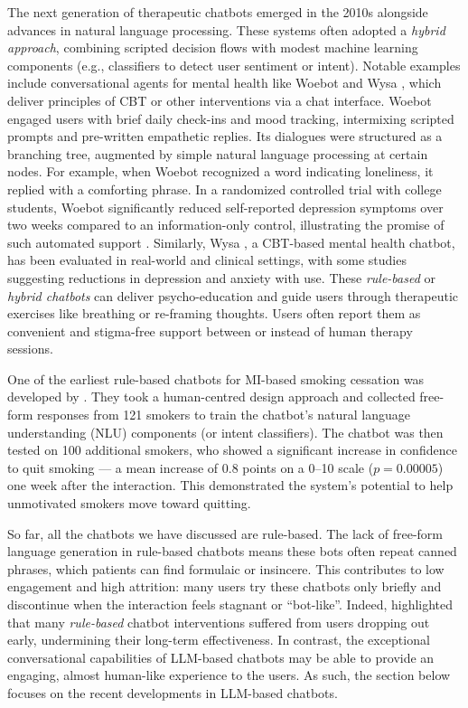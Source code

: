 The next generation of therapeutic chatbots emerged in the 2010s alongside advances in natural language processing. These systems often adopted a \emph{hybrid approach}, combining scripted decision flows with modest machine learning components (e.g., classifiers to detect user sentiment or intent). Notable examples include conversational agents for mental health like Woebot \cite{Fitzpatrick2017} and Wysa \cite{Chang2024}, which deliver principles of CBT or other interventions via a chat interface. Woebot engaged users with brief daily check-ins and mood tracking, intermixing scripted prompts and pre-written empathetic replies. Its dialogues were structured as a branching tree, augmented by simple natural language processing at certain nodes. For example, when Woebot recognized a word indicating loneliness, it replied with a comforting phrase. In a randomized controlled trial with college students, Woebot significantly reduced self-reported depression symptoms over two weeks compared to an information-only control, illustrating the promise of such automated support \cite{Fitzpatrick2017}. Similarly, Wysa \cite{Chang2024}, a CBT-based mental health chatbot, has been evaluated in real-world and clinical settings, with some studies suggesting reductions in depression and anxiety with use. These \emph{rule-based} or \emph{hybrid chatbots} can deliver psycho-education and guide users through therapeutic exercises like breathing or re-framing thoughts. Users often report them as convenient and stigma-free support between or instead of human therapy sessions.

One of the earliest rule-based chatbots for MI-based smoking cessation was developed by \citet{almusharraf2018motivating}. They took a human-centred design approach and collected free-form responses from 121 smokers to train the chatbot's natural language understanding (NLU) components (or intent classifiers). The chatbot was then tested on 100 additional smokers, who showed a significant increase in confidence to quit smoking --- a mean increase of 0.8 points on a 0–10 scale ($p=0.00005$) one week after the interaction. This demonstrated the system's potential to help unmotivated smokers move toward quitting.

So far, all the chatbots we have discussed are rule-based. The lack of free-form language generation in rule-based chatbots means these bots often repeat canned phrases, which patients can find formulaic or insincere. This contributes to low engagement and high attrition: many users try these chatbots only briefly and discontinue when the interaction feels stagnant or ``bot-like''. Indeed, \citet{LIMPANOPPARAT2024100081} highlighted that many \emph{rule-based} chatbot interventions suffered from users dropping out early, undermining their long-term effectiveness. In contrast, the exceptional conversational capabilities of LLM-based chatbots may be able to provide an engaging, almost human-like experience to the users. As such, the section below focuses on the recent developments in LLM-based chatbots.


